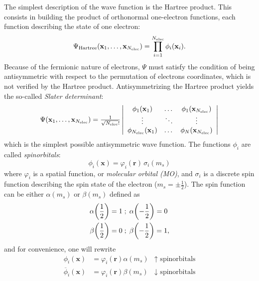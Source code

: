 \documentclass[./thesis.tex]{subfiles}
\begin{document}
The simplest description of the wave function is the Hartree product. This consists in 
building the product of orthonormal one-electron functions, each function describing the state of
one electron:
\begin{equation}
\Psi_{\text{Hartree}}({\bf x}_1,\dots,{\bf x}_{{N_\text{elec}}})  = \prod_{i=1}^{N_\text{elec}} \phi_i(\textbf{x}_i).
\end{equation}
Because of the fermionic nature of electrons, $\Psi$ must satisfy the condition of being antisymmetric with respect to the permutation of electrons coordinates, which is not verified by the Hartree product.
Antisymmetrizing the Hartree product yields the so-called \emph{Slater determinant}:
\begin{equation}
\begin{array}{c}
 \Psi({\bf x}_1,\dots,{\bf x}_{{N_\text{elec}}}) = 
\frac{1}{\sqrt{{N_\text{elec}}}!} \left|
 \begin{array}{ccc}
 \phi_1({\bf x}_1) & \dots & \phi_1({\bf x}_{{N_\text{elec}}}) \\
 \vdots              & \ddots &   \vdots             \\
 \phi_{{N_\text{elec}}}({\bf x}_1) & \dots & \phi_N({\bf x}_{{N_\text{elec}}}) \\
 \end{array}
\right| \\ 
\end{array} 
\label{eq:slater1}
\end{equation}
which is the simplest possible antisymmetric wave function.
The functions $\phi_i$ are called \emph{spinorbitals}:
\begin{equation}
\phi_i(\textbf{x}) = \varphi_i(\textbf{r}) \, \sigma_i(m_s)
\end{equation}
where $\varphi_i$ is a spatial function, or \emph{molecular orbital (MO)}, and $\sigma_i$ is a
discrete spin function describing the spin state of the electron ($m_s = \pm \frac{1}{2}$). The spin
function can be either $\alpha(m_s)$ or $\beta(m_s)$ defined as
\begin{align}
\alpha \qty(\frac{1}{2}) = 1  \; &; \;  \alpha \qty(-\frac{1}{2}) = 0   \\ \nonumber
\beta  \qty(\frac{1}{2}) = 0  \; &; \;  \beta  \qty(-\frac{1}{2}) = 1,
\end{align}
and for convenience, one will rewrite
\begin{align}
\phi_i(\textbf{x}) & = \varphi_i(\mathbf{r}) \alpha(m_s) & \text{$\uparrow$ spinorbitals} \\ \nonumber
\overline{\phi}_i(\textbf{x}) & = \varphi_i(\mathbf{r}) \beta(m_s) & \text{$\downarrow$ spinorbitals}
\end{align}
\end{document}
